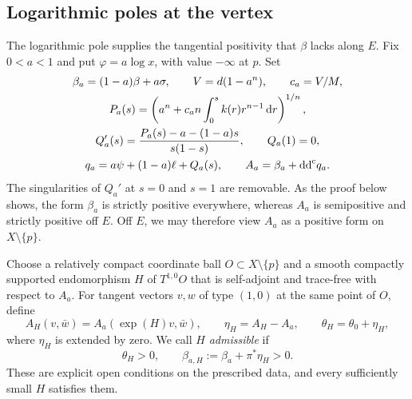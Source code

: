 \subsection{Logarithmic poles at the vertex}

The logarithmic pole supplies the tangential positivity that $\beta$ lacks along $E$. Fix $0<a<1$ and put $\varphi=a\log x$, with value $-\infty$ at $p$. Set
\begin{equation}\label{eq:cone-logarithmic-data}
\begin{gathered}
\beta_a=(1-a)\beta+a\sigma,\qquad V=d(1-a^n),\qquad c_a=V/M,\\
P_a(s)=\left(a^n+c_an\int_0^s k(r)r^{n-1}\,\mathrm{d} r\right)^{1/n},\\
Q_a'(s)=\frac{P_a(s)-a-(1-a)s}{s(1-s)},\qquad Q_a(1)=0,\\
q_a=a\psi+(1-a)\ell+Q_a(s),\qquad A_a=\beta_a+\mathrm{dd}^{\mathrm{c}} q_a.
\end{gathered}
\end{equation}
The singularities of $Q_a'$ at $s=0$ and $s=1$ are removable. As the proof below shows, the form $\beta_a$ is strictly positive everywhere, whereas $A_a$ is semipositive and strictly positive off $E$. Off $E$, we may therefore view $A_a$ as a positive form on $X\setminus\{p\}$.

Choose a relatively compact coordinate ball $O\subset X\setminus\{p\}$ and a smooth compactly supported endomorphism $H$ of $T^{1,0}O$ that is self-adjoint and trace-free with respect to $A_a$. For tangent vectors $v,w$ of type $(1,0)$ at the same point of $O$, define
\begin{equation}\label{eq:cone-deformed-background}
A_H(v,\bar w)=A_a(\exp(H)v,\bar w),\qquad \eta_H=A_H-A_a,\qquad \theta_H=\theta_0+\eta_H,
\end{equation}
where $\eta_H$ is extended by zero. We call $H$ \emph{admissible} if
\begin{equation}\label{eq:cone-admissible-positivity}
\theta_H>0,\qquad \beta_{a,H}:=\beta_a+\pi^*\eta_H>0.
\end{equation}
These are explicit open conditions on the prescribed data, and every sufficiently small $H$ satisfies them.

